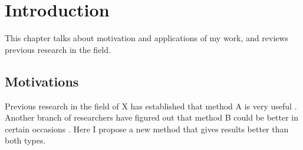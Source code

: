 \chapter{Introduction}
\label{cha:introduction}

This chapter talks about motivation and applications of my work, and reviews previous research in the field.

\section{Motivations}
\label{sec:motivations}

Previous research in the field of X has established that method A is very useful \cite{Fisher:1954,Robbins:1951aa,Knight:1921}.
Another branch of researchers have figured out that method B could be better in certain occasions \cite{Wright:1921aa,Caratheodory:1909aa,Gibbs:1902,Clausius:1857}.
Here I propose a new method that gives results better than both types.

\Blindtext[1]
